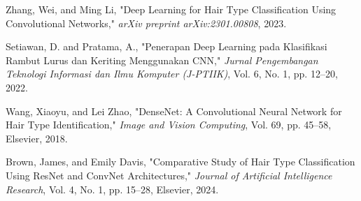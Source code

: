 \documentclass[12pt,a4paper]{article}
\begin{document}
\newpage

\begin{thebibliography}{9}

Zhang, Wei, and Ming Li, 
"Deep Learning for Hair Type Classification Using Convolutional Networks," 
\textit{arXiv preprint arXiv:2301.00808}, 2023.

Setiawan, D. and Pratama, A., 
"Penerapan Deep Learning pada Klasifikasi Rambut Lurus dan Keriting Menggunakan CNN," 
\textit{Jurnal Pengembangan Teknologi Informasi dan Ilmu Komputer (J-PTIIK)}, 
Vol. 6, No. 1, pp. 12--20, 2022.

Wang, Xiaoyu, and Lei Zhao, 
"DenseNet: A Convolutional Neural Network for Hair Type Identification," 
\textit{Image and Vision Computing}, 
Vol. 69, pp. 45--58, Elsevier, 2018.

Brown, James, and Emily Davis, 
"Comparative Study of Hair Type Classification Using ResNet and ConvNet Architectures," 
\textit{Journal of Artificial Intelligence Research}, 
Vol. 4, No. 1, pp. 15--28, Elsevier, 2024.

\end{thebibliography}
\end{document}
